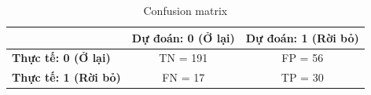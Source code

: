 \begin{table}[H]
  \centering
  \caption{Confusion matrix}
  \begin{tabular}{@{}lcc@{}}
    \toprule
    & \textbf{Dự đoán: 0 (Ở lại)} & \textbf{Dự đoán: 1 (Rời bỏ)} \\
    \midrule
    \textbf{Thực tế: 0 (Ở lại)} & TN = 191 & FP = 56 \\
    \textbf{Thực tế: 1 (Rời bỏ)} & FN = 17 & TP = 30 \\
    \bottomrule
  \end{tabular}
\end{table}
